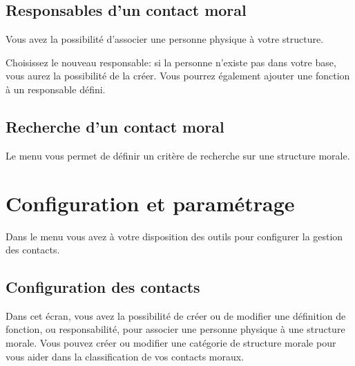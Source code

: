 \documentclass[a4paper,10pt,oneside,french]{sphinxmanual}
\begin{document}
\noindent{}


\subsection{Responsables d’un contact moral}
\label{\detokenize{contacts/legal_entity:responsables-d-un-contact-moral}}
Vous avez la possibilité d’associer une personne physique à votre structure.

Choisissez le nouveau responsable: si la personne n’existe pas dans votre base, vous aurez la possibilité de la créer. Vous pourrez également ajouter une fonction à un responsable défini.

\noindent{}


\subsection{Recherche d’un contact moral}
\label{\detokenize{contacts/legal_entity:recherche-d-un-contact-moral}}
Le menu  vous permet de définir un critère de recherche sur une structure morale.

\noindent{}


\section{Configuration et paramétrage}
\label{\detokenize{contacts/configuration:configuration-et-parametrage}}\label{\detokenize{contacts/configuration::doc}}
Dans le menu  vous avez à votre disposition des outils pour configurer la gestion des contacts.


\subsection{Configuration des contacts}
\label{\detokenize{contacts/configuration:configuration-des-contacts}}
Dans cet écran, vous avez la possibilité de créer ou de modifier une définition de fonction, ou responsabilité, pour associer une personne physique à une structure morale. Vous pouvez créer ou modifier une catégorie de structure morale pour vous aider dans la classification de vos contacts moraux.
\end{document}
